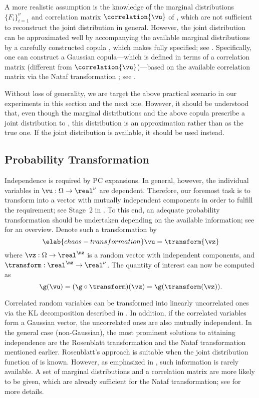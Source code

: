 A more realistic assumption is the knowledge of the marginal distributions $\{
F_i \}_{i = 1}^\nu$ and correlation matrix $\correlation{\vu}$ of \vu, which are
not sufficient to reconstruct the joint distribution in general. However, the
joint distribution can be approximated well by accompanying the available
marginal distributions by a carefully constructed copula \cite{nelsen2006},
which makes \vu fully specified; see . Specifically,
one can construct a Gaussian copula---which is defined in terms of a correlation
matrix (different from $\correlation{\vu}$)---based on the available correlation
matrix via the Nataf transformation \cite{liu1986}; see
.

Without loss of generality, we are target the above practical scenario in our
experiments in this section and the next one. However, it should be understood
that, even though the marginal distributions and the above copula prescribe a
joint distribution to \vu, this distribution is an approximation rather than as
the true one. If the joint distribution is available, it should be used instead.

\subsection{Probability Transformation}

Independence is required by \ac{PC} expansions. In general, however, the
individual variables in $\vu: \Omega \to \real^\nu$ are dependent. Therefore,
our foremost task is to transform \vu into a vector with mutually independent
components in order to fulfill the requirement; see Stage~2 in
. To this end, an adequate probability transformation
should be undertaken depending on the available information; see
\cite{eldred2008} for an overview. Denote such a transformation by
\begin{equation} \elab{chaos-transformation}
  \vu = \transform{\vz}
\end{equation}
where $\vz: \Omega \to \real^\nz$ is a random vector with \nz independent
components, and $\transform: \real^\nz \to \real^\nu$. The quantity of interest
\g can now be computed as
\[
  \g(\vu) = (\g \circ \transform)(\vz) = \g(\transform(\vz)).
\]

Correlated random variables can be transformed into linearly uncorrelated ones
via the \ac{KL} decomposition described in . In addition,
if the correlated variables form a Gaussian vector, the uncorrelated ones are
also mutually independent. In the general case (non-Gaussian), the most
prominent solutions to attaining independence are the Rosenblatt transformation
\cite{rosenblatt1952} and the Nataf transformation mentioned earlier.
Rosenblatt's approach is suitable when the joint distribution function of \vu is
known. However, as emphasized in , such information is
rarely available. A set of marginal distributions and a correlation matrix are
more likely to be given, which are already sufficient for the Nataf
transformation; see  for more details.

